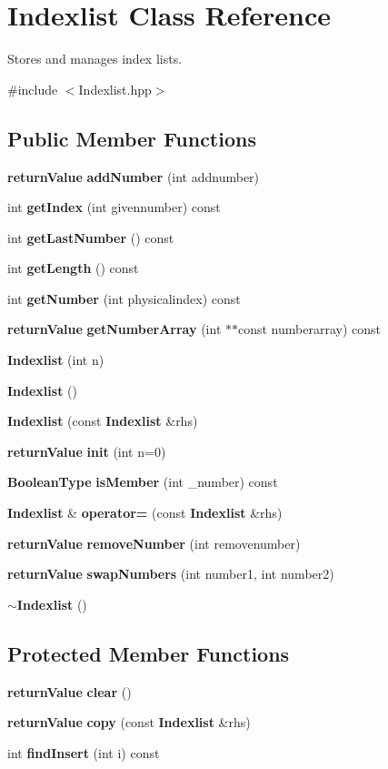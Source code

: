 \section{Indexlist Class Reference}
\label{classIndexlist}


Stores and manages index lists.  




{\ttfamily \#include $<$Indexlist.hpp$>$}

\subsection*{Public Member Functions}
\begin{DoxyCompactItemize}
\item 
{\bf returnValue} {\bf addNumber} (int addnumber)
\item 
int {\bf getIndex} (int givennumber) const 
\item 
int {\bf getLastNumber} () const 
\item 
int {\bf getLength} () const 
\item 
int {\bf getNumber} (int physicalindex) const 
\item 
{\bf returnValue} {\bf getNumberArray} (int $\ast$$\ast$const numberarray) const 
\item 
{\bf Indexlist} (int n)
\item 
{\bf Indexlist} ()
\item 
{\bf Indexlist} (const {\bf Indexlist} \&rhs)
\item 
{\bf returnValue} {\bf init} (int n=0)
\item 
{\bf BooleanType} {\bf isMember} (int \_\-number) const 
\item 
{\bf Indexlist} \& {\bf operator=} (const {\bf Indexlist} \&rhs)
\item 
{\bf returnValue} {\bf removeNumber} (int removenumber)
\item 
{\bf returnValue} {\bf swapNumbers} (int number1, int number2)
\item 
{\bf $\sim$Indexlist} ()
\end{DoxyCompactItemize}
\subsection*{Protected Member Functions}
\begin{DoxyCompactItemize}
\item 
{\bf returnValue} {\bf clear} ()
\item 
{\bf returnValue} {\bf copy} (const {\bf Indexlist} \&rhs)
\item 
int {\bf findInsert} (int i) const 
\end{DoxyCompactItemize}
